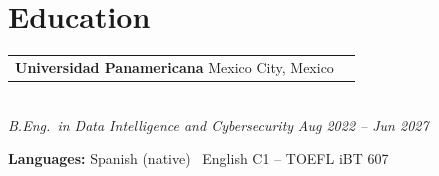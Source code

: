 \documentclass[10pt, letterpaper]{article}
\makeatletter
\newcommand{\entry}[2]{%
  \noindent\begin{tabular*}{\textwidth}{@{}l@{\extracolsep{\fill}}r@{}}
    #1 & #2
  \end{tabular*}}
\makeatother
\begin{document}
\section{Education}

\entry{\textbf{Universidad Panamericana} \quad Mexico City, Mexico}{}\\
\textit{B.Eng.\ in Data Intelligence and Cybersecurity}
\hfill \textit{Aug 2022 -- Jun 2027}

\medskip

\noindent\textbf{Languages:} Spanish (native) \textbullet\ English C1 -- TOEFL iBT 607
\end{document}
